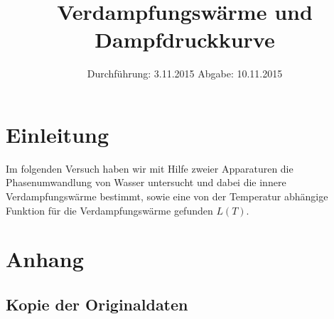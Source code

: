 

\subject{V 203}
\title{Verdampfungswärme und Dampfdruckkurve}
\date{
  Durchführung: 3.11.2015
  \hspace{3em}
  Abgabe: 10.11.2015
}



\maketitle
\thispagestyle{empty}
\tableofcontents
\newpage

\section{Einleitung}
Im folgenden Versuch haben wir mit Hilfe zweier Apparaturen die
Phasenumwandlung von Wasser untersucht und dabei die innere Verdampfungswärme
bestimmt, sowie eine von der Temperatur abhängige Funktion für die
Verdampfungswärme gefunden $L(T)$.




\section{Anhang}
\subsection{Kopie der Originaldaten}
\newpage

\nocite{*}

\printbibliography


